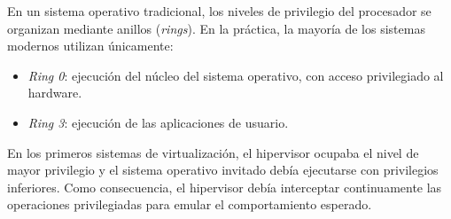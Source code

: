 En un sistema operativo tradicional, los niveles de privilegio del procesador se organizan mediante anillos (\textit{rings}). En la práctica, la mayoría de los sistemas modernos utilizan únicamente:
\begin{itemize}
  \item \textit{Ring 0}: ejecución del núcleo del sistema operativo, con acceso privilegiado al hardware.
  \item \textit{Ring 3}: ejecución de las aplicaciones de usuario.
\end{itemize}
En los primeros sistemas de virtualización, el hipervisor ocupaba el nivel de mayor privilegio y el sistema operativo invitado debía ejecutarse con privilegios inferiores. Como consecuencia, el hipervisor debía interceptar continuamente las operaciones privilegiadas para emular el comportamiento esperado.

